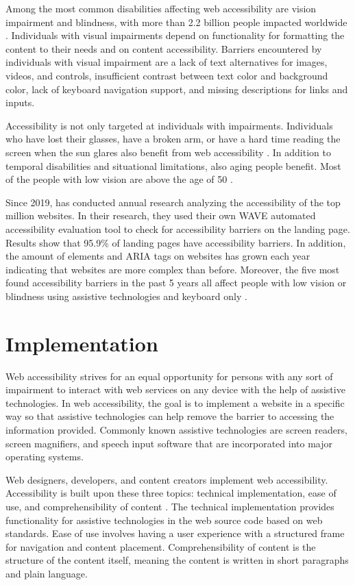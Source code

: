 Among the most common disabilities affecting web accessibility are vision impairment and blindness, with more than 2.2 billion people impacted worldwide \citep[Chapter~1]{webaccessibility, whovision}. Individuals with visual impairments depend on functionality for formatting the content to their needs and on content accessibility. Barriers encountered by individuals with visual impairment are a lack of text alternatives for images, videos, and controls, insufficient contrast between text color and background color, lack of keyboard navigation support, and missing descriptions for links and inputs. 

Accessibility is not only targeted at individuals with impairments. Individuals who have lost their glasses, have a broken arm, or have a hard time reading the screen when the sun glares also benefit from web accessibility \citep{w3cbarriers}. In addition to temporal disabilities and situational limitations, also aging people benefit. Most of the people with low vision are above the age of 50 \citep{whovision}.

Since 2019, \textcite{webaimmillions} has conducted annual research analyzing the accessibility of the top million websites. In their research, they used their own WAVE automated accessibility evaluation tool to check for accessibility barriers on the landing page. Results show that 95.9\% of landing pages have accessibility barriers. In addition, the amount of elements and ARIA tags on websites has grown each year indicating that websites are more complex than before. Moreover, the five most found accessibility barriers in the past 5 years all affect people with low vision or blindness using assistive technologies and keyboard only \citep{webaimmillions}. 

\section{Implementation}

Web accessibility strives for an equal opportunity for persons with any sort of impairment to interact with web services on any device with the help of assistive technologies. In web accessibility, the goal is to implement a website in a specific way so that assistive technologies can help remove the barrier to accessing the information provided. Commonly known assistive technologies are screen readers, screen magnifiers, and speech input software that are incorporated into major operating systems.

Web designers, developers, and content creators implement web accessibility. Accessibility is built upon these three topics: technical implementation, ease of use, and comprehensibility of content \citep{webaccessibilitydefinition}. The technical implementation provides functionality for assistive technologies in the web source code based on web standards. Ease of use involves having a user experience with a structured frame for navigation and content placement. Comprehensibility of content is the structure of the content itself, meaning the content is written in short paragraphs and plain language. 

